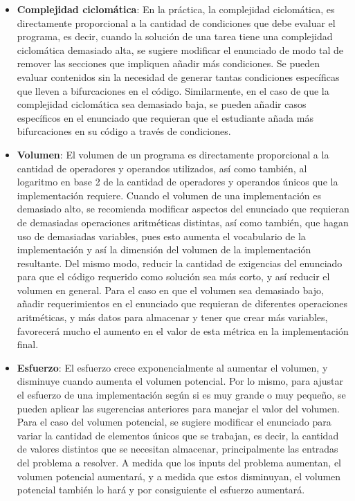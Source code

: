 \documentclass[letterpaper,12pt]{article}
\begin{document}
\begin{itemize}
  \item \textbf{Complejidad ciclomática}: En la práctica, la complejidad ciclomática, es directamente proporcional a la cantidad de condiciones que debe evaluar el programa, es decir, cuando la solución de una tarea tiene una complejidad ciclomática demasiado alta, se sugiere modificar el enunciado de modo tal de remover las secciones que impliquen añadir más condiciones. Se pueden evaluar contenidos sin la necesidad de generar tantas condiciones específicas que lleven a bifurcaciones en el código. Similarmente, en el caso de que la complejidad ciclomática sea demasiado baja, se pueden añadir casos específicos en el enunciado que requieran que el estudiante añada más bifurcaciones en su código a través de condiciones.
  \item \textbf{Volumen}: El volumen de un programa es directamente proporcional a la cantidad de operadores y operandos utilizados, así como también, al logaritmo en base 2 de la cantidad de operadores y operandos únicos que la implementación requiere. Cuando el volumen de una implementación es demasiado alto, se recomienda modificar aspectos del enunciado que requieran de demasiadas operaciones aritméticas distintas, así como también, que hagan uso de demasiadas variables, pues esto aumenta el vocabulario de la implementación y así la dimensión del volumen de la implementación resultante. Del mismo modo, reducir la cantidad de exigencias del enunciado para que el código requerido como solución sea más corto, y así reducir el volumen en general. Para el caso en que el volumen sea demasiado bajo, añadir requerimientos en el enunciado que requieran de diferentes operaciones aritméticas, y más datos para almacenar y tener que crear más variables, favorecerá mucho el aumento en el valor de esta métrica en la implementación final.
  \item \textbf{Esfuerzo}: El esfuerzo crece exponencialmente al aumentar el volumen, y disminuye cuando aumenta el volumen potencial. Por lo mismo, para ajustar el esfuerzo de una implementación según si es muy grande o muy pequeño, se pueden aplicar las sugerencias anteriores para manejar el valor del volumen. Para el caso del volumen potencial, se sugiere modificar el enunciado para variar la cantidad de elementos únicos que se trabajan, es decir, la cantidad de valores distintos que se necesitan almacenar, principalmente las entradas del problema a resolver. A medida que los inputs del problema aumentan, el volumen potencial aumentará, y a medida que estos disminuyan, el volumen potencial también lo hará y por consiguiente el esfuerzo aumentará.

\end{itemize}
\end{document}
